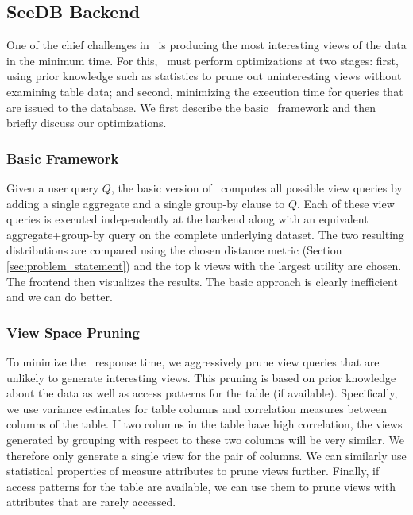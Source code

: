 \subsection{SeeDB Backend}
\label{subsec:seedb_backend}

One of the chief challenges in \SeeDB\ is producing the most interesting views
of the data in the minimum time. For this, \SeeDB\ must perform optimizations
at two stages: first, using prior knowledge such as statistics to prune out
uninteresting views without examining table data; and second, minimizing the
execution time for queries that are issued to the database. We first describe
the basic \SeeDB\ framework and then briefly discuss our optimizations.

\subsubsection{Basic Framework}
\label{subsubsec:basic_framework}

Given a user query $Q$, the basic version of \SeeDB\ computes all possible view
queries by adding a single aggregate and a single group-by clause to $Q$. Each
of these view queries is executed independently at the backend along with an
equivalent aggregate+group-by query on the complete underlying dataset. The two
resulting distributions are compared using the chosen distance metric (Section
\ref{sec:problem_statement}) and the top k views with the largest utility are
chosen. The frontend then visualizes the results. The basic approach is clearly inefficient and we
can do better.

\subsubsection{View Space Pruning}
\label{subsubsec:view_space_pruning}

To minimize the \SeeDB\ response time, we aggressively prune view queries that
are unlikely to generate interesting views. This pruning is based on prior
knowledge about the data as well as access patterns for the table (if
available). Specifically, we use variance estimates for table columns and
correlation measures between columns of the table. If two columns in the table
have high correlation, the views generated by grouping with respect to these two
columns will be very similar. We therefore only generate a single view for the
pair of columns. We can similarly use statistical properties of measure
attributes to prune views further. Finally, if access patterns for the table are
available, we can use them to prune views with attributes that are
rarely accessed.

